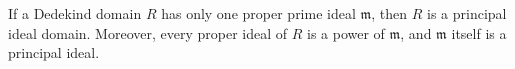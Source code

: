 If a Dedekind domain $R$ has only one proper prime ideal $\mathfrak{m}$, then $R$ is a principal ideal domain. Moreover, every proper ideal of $R$ is a power of $\mathfrak{m}$, and $\mathfrak{m}$ itself is a principal ideal.
